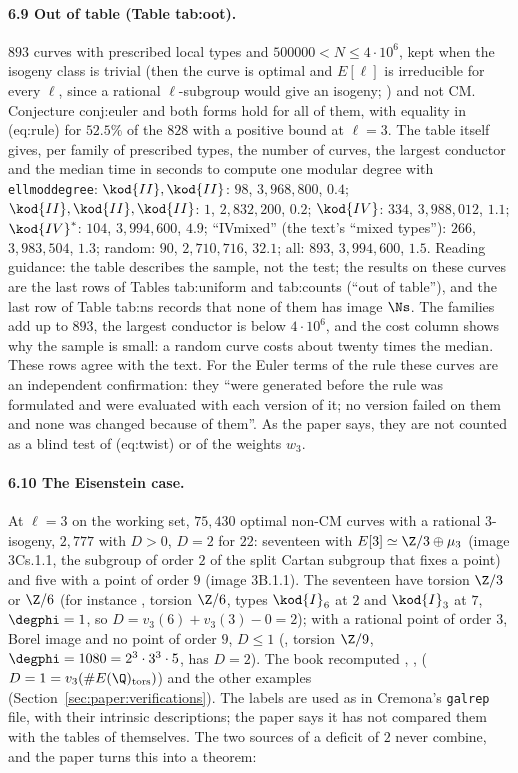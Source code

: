 \begin{sloppypar}
\paragraph{6.9 Out of table (Table tab:oot).} $893$ curves with prescribed local types and $500000<N\le4\cdot10^6$, kept when the isogeny class is trivial (then the curve is optimal and $E[\ell]$ is
irreducible for every $\ell$, since a rational $\ell$-subgroup would give an isogeny; ) and not CM. Conjecture conj:euler and both forms hold for all of them, with equality in
(eq:rule) for $52.5\%$ of the $828$ with a positive bound at $\ell=3$. The table itself gives, per family of prescribed types, the number of curves, the largest conductor
and the median time in seconds to compute one modular degree with \texttt{ellmoddegree}: $\kod{II},\kod{II}$: $98$, $3{,}968{,}800$, $0.4$; $\kod{II},\kod{II},\kod{II}$: $1$, $2{,}832{,}200$, $0.2$;
$\kod{IV}$: $334$, $3{,}988{,}012$, $1.1$; $\kod{IV}^*$: $104$, $3{,}994{,}600$, $4.9$; ``IVmixed'' (the text's ``mixed types''): $266$, $3{,}983{,}504$, $1.3$; random: $90$, $2{,}710{,}716$, $32.1$; all: $893$,
$3{,}994{,}600$, $1.5$. Reading guidance: the table describes the sample, not the test; the results on these curves are the last rows of Tables tab:uniform and tab:counts
(``out of table''), and the last row of Table tab:ns records that none of them has image $\Ns$. The families add up to $893$, the largest conductor is below $4\cdot10^6$, and
the cost column shows why the sample is small: a random curve costs about twenty times the median. These rows agree with the text. For the Euler terms of the rule these curves are an independent confirmation: they ``were generated before the rule was formulated and were evaluated with each version of it; no version failed on them and none was changed because of them''. As the paper says, they are not counted as a blind test of (eq:twist) or of the weights $w_3$.

\paragraph{6.10 The Eisenstein case.} At $\ell=3$ on the working set, $75{,}430$ optimal non-CM curves with a rational $3$-isogeny, $2{,}777$ with $D>0$, $D=2$ for $22$: seventeen with $E[3]\simeq\Z/3\oplus\mu_3$
(image 3Cs.1.1, the subgroup of order $2$ of the split Cartan subgroup that fixes a point) and five with a point of order $9$ (image 3B.1.1). The seventeen have torsion $\Z/3$ or $\Z/6$ (for
instance , torsion $\Z/6$, types $\kod{I}_6$ at $2$ and $\kod{I}_3$ at $7$, $\degphi=1$, so $D=v_3(6)+v_3(3)-0=2$); with a rational point of order $3$, Borel image and no point of order $9$, $D\le1$
(, torsion $\Z/9$, $\degphi=1080=2^3\cdot3^3\cdot5$, has $D=2$). The book recomputed , ,  ($D=1=v_3(\#E(\Q)_{\mathrm{tors}})$) and the other examples
(Section~\ref{sec:paper:verifications}). The labels are used as in Cremona's \texttt{galrep} file, with their intrinsic descriptions; the paper says it has not compared them with the tables
of \cite{Sutherland16} themselves. The two sources of a deficit of $2$ never combine, and the paper turns this into a theorem:


\end{sloppypar}
